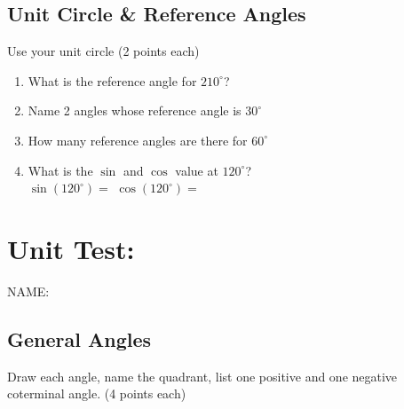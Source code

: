 \documentclass[12pt]{article}
\begin{document}
\subsection*{Unit Circle \& Reference Angles}

Use your unit circle (2 points each)\\

\begin{enumerate}[resume]

\item What is the reference angle for $210^\circ$?\\

\item Name 2 angles whose reference angle is $30^\circ$\\

\item How many reference angles are there for $60^\circ$\\

\item What is the $\sin$ and $\cos$ value at $120^\circ$?\\

$\sin(120^\circ)=$ \hspace{1in} $\cos(120^\circ)=$

\end{enumerate}

\section*{Unit Test:}

\hfill NAME:\underline{\hspace*{3in}}

\subsection*{General Angles}

Draw each angle, name the quadrant, list one positive and one negative coterminal angle. (4 points each)\\
\end{document}
